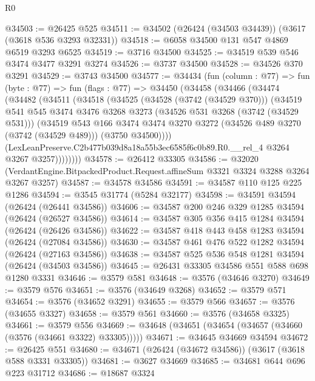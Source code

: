 \begin{lexlean}{R0}
\begin{coremodule}
@34503 := @26425 @525
@34511 := @34502 (@26424 (@34503 @34439)) (@3617 (@3618 @536 @3293 @32331))
@34518 := @6058 @34500 @131 @547 @4869 @6519 @3293 @6525
@34519 := @3716 @34500
@34525 := @34519 @539 @546 @3474 @3477 @3291 @3274
@34526 := @3737 @34500
@34528 := @34526 @370 @3291
@34529 := @3743 @34500
@34577 := @34434
    (fun (column : @77) =>
    fun (byte : @77) =>
    fun (flags : @77) =>
    @34450
      (@34458
        (@34466
          (@34474
            (@34482
              (@34511
                (@34518
                  (@34525
                    (@34528 (@3742 (@34529 @370)))
                    (@34519
                      @541
                      @545
                      @3474
                      @3476
                      @3268
                      @3273
                      (@34526 @531 @3268 (@3742 (@34529 @531)))
                      (@34519
                        @543
                        @166
                        @3474
                        @3474
                        @3270
                        @3272
                        (@34526 @489 @3270 (@3742 (@34529 @489)))
                        (@3750 @34500))))
                  (LexLeanPreserve.C2b477b039d8a18a55b3ec6585f6c0b89.R0.__rel_4
                    @3264
                    @3267
                    @3257))))))))
@34578 := @26412 @33305
@34586 := @32020
    (VerdantEngine.BitpackedProduct.Request.affineSum @3321 @3324 @3288 @3264 @3267 @3257)
@34587 := @34578 @34586
@34591 := @34587 @110 @125 @225 @1286
@34594 := @3545 @31774 (@5284 @32177)
@34598 := @34591 @34594 (@26424 (@26441 @34586))
@34606 := @34587 @200 @246 @329 @1285 @34594 (@26424 (@26527 @34586))
@34614 := @34587 @305 @356 @415 @1284 @34594 (@26424 (@26426 @34586))
@34622 := @34587 @418 @443 @458 @1283 @34594 (@26424 (@27084 @34586))
@34630 := @34587 @461 @476 @522 @1282 @34594 (@26424 (@27163 @34586))
@34638 := @34587 @525 @536 @548 @1281 @34594 (@26424 (@34503 @34586))
@34645 := @26431 @33305 @34586 @551 @588 @698 @1280 @3331
@34646 := @3579 @581
@34648 := @3576 (@34646 @3270)
@34649 := @3579 @576
@34651 := @3576 (@34649 @3268)
@34652 := @3579 @571
@34654 := @3576 (@34652 @3291)
@34655 := @3579 @566
@34657 := @3576 (@34655 @3327)
@34658 := @3579 @561
@34660 := @3576 (@34658 @3325)
@34661 := @3579 @556
@34669 := @34648 (@34651 (@34654 (@34657 (@34660 (@3576 (@34661 @3322) @33305)))))
@34671 := @34645 @34669 @34594
@34672 := @26425 @551
@34680 := @34671 (@26424 (@34672 @34586)) (@3617 (@3618 @588 @3331 @33305))
@34681 := @3627 @34669
@34685 := @34681 @644 @696 @223 @31712
@34686 := @18687 @3324

\end{coremodule}
\end{lexlean}
